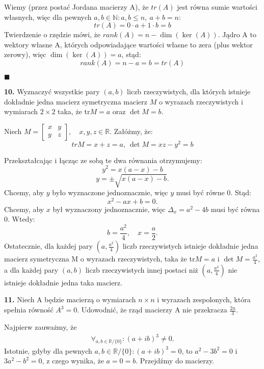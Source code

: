 \documentclass{article}
\begin{document}
Wiemy (przez postać Jordana macierzy A), że $tr(A)$ jest równa sumie wartości własnych, więc dla pewnych $a,b\in\mathds{N}:a,b\leq n,\ a+b=n$: $$tr(A)=0\cdot a+1\cdot b=b$$
Twierdzenie o rzędzie mówi, że $rank(A)=n-\dim(\ker(A))$. Jądro A to wektory własne A, których odpowiadające wartości własne to zera (plus wektor zerowy), więc $\dim(\ker(A))=a$, stąd:
$$rank(A)=n-a=b=tr(A)$$
\begin{flushright}
$\blacksquare$
\end{flushright}

\begin{center}
  \large\textbf{10.} Wyznaczyć wszystkie pary $(a,b)$ liczb rzeczywistych, dla których istnieje dokładnie jedna macierz symetryczna macierz $M$ o wyrazach rzeczywistych i wymiarach $2\times2$ taka, że tr$ M=a$ oraz $\det M=b$.  
\end{center}

\normalsize

Niech $M=\left[\begin{array}{cc}
x & y \\
y & z
\end{array}\right],\quad x,y,z\in\mathds{R}$. Załóżmy, że: $$trM=x+z=a,\ \det M=xz-y^2=b$$

Przekształcając i łącząc ze sobą te dwa równania otrzymujemy: 
$$y^2=x(a-x)-b$$
$$y=\pm\sqrt{x(a-x)-b}.$$
Chcemy, aby $y$ było wyznaczone jednoznacznie, więc $y$ musi być równe 0. Stąd:
$$x^2-ax+b=0.$$
Chcemy, aby $x$ był wyznaczony jednoznacznie, więc $\Delta_x=a^2-4b$ musi być równa 0. Wtedy:
$$b=\frac{a^2}{4},\quad x=\frac{a}{2}.$$
Ostatecznie, dla każdej pary $(a,\frac{a^2}{4})$ liczb rzeczywistych istnieje dokładnie jedna macierz symetryczna M o wyrazach rzeczywistych, taka że tr$M=a$ i $\det M=\frac{a^2}{4}$, a dla każdej pary $(a,b)$ liczb rzeczywistych innej postaci niż $(a,\frac{a^2}{4})$ nie istnieje dokładnie jedna taka macierz.

\begin{center}
 \large \textbf{11.} Niech A będzie macierzą o wymiarach $n\times n$ i wyrazach zespolonych, która spełnia równość $A^3 = 0$. Udowodnić, że rząd macierzy A nie przekracza $\frac{2n}{3}$.   
\end{center}

\normalsize

Najpierw zauważmy, że \begin{eqnarray}
\forall_{a,b\in\mathds{R}/\{0\}}: (a+ib)^3\neq 0.
\end{eqnarray}
Istotnie, gdyby dla pewnych $a,b\in\mathds{R}/\{0\}: (a+ib)^3=0$, to $a^2-3b^2=0$ i $3a^2-b^2=0$, z czego wynika, że $a=0=b$. Przejdźmy do macierzy.
\end{document}
